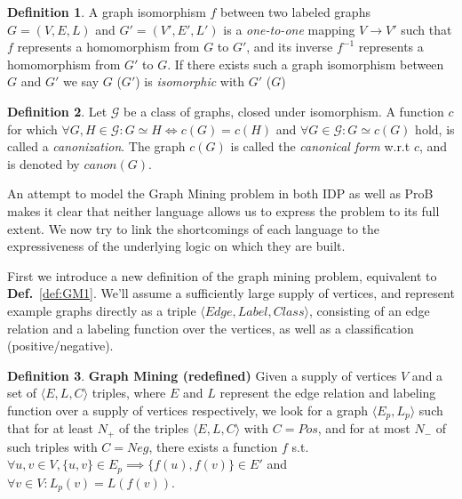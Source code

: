 \documentclass{article}
\theoremstyle{definition}
\newtheorem{definition}{Definition}[section]
\begin{document}
\begin{definition}
A graph isomorphism $f$ between two labeled graphs $G = (V,E,L)$ and $G' = (V',E',L')$ is a \emph{one-to-one} mapping $V \rightarrow V'$ 
such that $f$ represents a homomorphism from $G$ to $G'$,
and its inverse $f^{-1}$ represents a homomorphism from $G'$ to $G$.
If there exists such a graph isomorphism between $G$ and $G'$ we say $G$ ($G'$) is \emph{isomorphic} with $G'$ ($G$)
\end{definition}


\begin{definition}
Let $\mathcal{G}$ be a class of graphs, closed under isomorphism.
A function $c$ for which $\forall G,H \in \mathcal{G} : G \simeq H \iff c(G) = c(H)$ and $\forall G \in \mathcal{G} : G \simeq c(G)$ hold, is called a \emph{canonization}.
The graph $c(G)$ is called the \emph{canonical form} w.r.t $c$, and is denoted by $\mathit{canon}(G)$.
\end{definition}

An attempt to model the Graph Mining problem in both IDP as well as ProB makes it clear
that neither language allows us to express the problem to its full extent.
We now try to link the shortcomings of each language to the expressiveness of the underlying logic on which they are built.

First we introduce a new definition of the graph mining problem, equivalent to \textbf{Def.}~\ref{def:GM1}.
We'll assume a sufficiently large supply of vertices, and represent example graphs directly as a triple $\langle Edge, Label, Class\rangle$, consisting of an edge relation and a labeling function over the vertices, as well as a classification (positive/negative).

\begin{definition} \textbf{Graph Mining (redefined)}
\label{def:gm2}
Given a supply of vertices $V$ and a set of $\langle E, L, C\rangle$ triples,
where $E$ and $L$ represent the edge relation and labeling function over a supply of vertices respectively,
we look for a graph $\langle E_{p}, L_{p}\rangle$ such that
for at least $N_{+}$ of the triples $\langle E, L, C\rangle$ with $C=Pos$, and for at most $N_{-}$ of such triples with $C=Neg$, there exists a function $f$ s.t. $\forall u,v \in V, \lbrace u,v\rbrace \in E_{p} \implies \lbrace f(u),f(v)\rbrace \in E'$ and $\forall v \in V : L_{p}(v) = L(f(v))$.
\end{definition}
\end{document}
